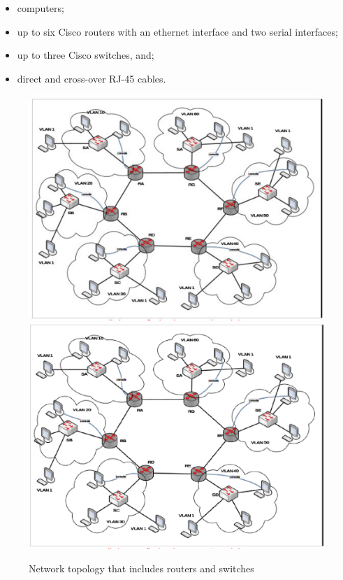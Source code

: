 \begin{itemize}
\item computers;
\item up to six Cisco routers with an ethernet interface and two serial interfaces;
\item up to three Cisco switches, and;
\item direct and cross-over RJ-45 cables.
\end{itemize}

\begin{figure}
\centering
\ifpdf
\includegraphics[width=0.9\linewidth]{Figures/routers_and_switches.pdf}
\else
\includegraphics[width=0.9\linewidth]{Figures/routers_and_switches.eps}
\fi
\caption{Network topology that includes routers and switches}
\label{fig:routers_and_switches}
\end{figure}

